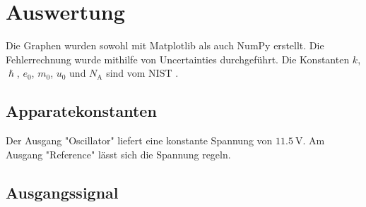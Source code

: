 \section{Auswertung}
\label{sec:Auswertung}


Die Graphen wurden sowohl mit Matplotlib \cite{matplotlib} als auch NumPy \cite{numpy} erstellt. Die
Fehlerrechnung wurde mithilfe von Uncertainties \cite{uncertainties} durchgeführt.
Die Konstanten $k$, $\hslash$, $e_0$, $m_0$, $u_0$ und $N_\text{A}$ sind vom NIST \cite{nistgov}.

\subsection{Apparatekonstanten}
Der Ausgang "Oscillator" liefert eine konstante Spannung von $\SI{11,5}{\volt}$.
Am Ausgang "Reference" lässt sich die Spannung regeln.
\subsection{Ausgangssignal}
